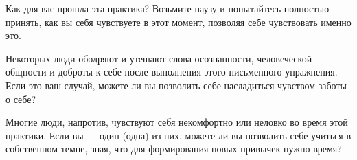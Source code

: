 \newpage


\vspace{3ex}

Как для вас прошла эта практика? Возьмите паузу и попытайтесь полностью принять, как вы себя чувствуете в этот момент, позволяя себе чувствовать именно это. 

Некоторых люди ободряют и утешают слова осознанности, человеческой общности и доброты к себе после выполнения этого письменного упражнения. Если это ваш случай, можете ли вы позволить себе насладиться чувством заботы о себе?

Многие люди, напротив, чувствуют себя некомфортно или неловко во время этой практики. Если вы --- один (одна) из них, можете ли вы позволить себе учиться в собственном темпе, зная, что для формирования новых привычек нужно время?


